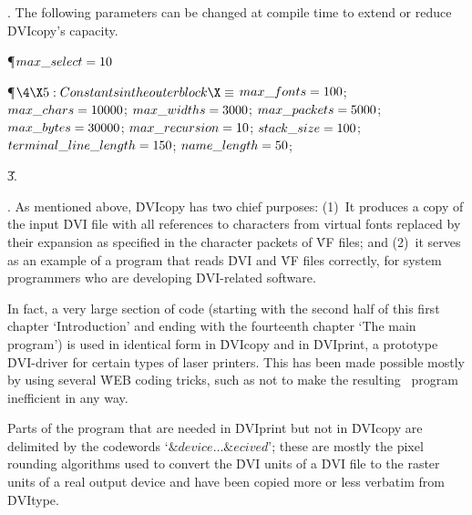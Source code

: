 . The following parameters can be changed at compile time to extend or
reduce \.{DVIcopy}'s capacity.

\Y\P\D {}$\\{max\_select}=10$\par
\Y\P$\4\X5:Constants in the outer block\X\S$\6
$\\{max\_fonts}=100$;\6
$\\{max\_chars}=10000$;\6
$\\{max\_widths}=3000$;\6
$\\{max\_packets}=5000$;\6
$\\{max\_bytes}=30000$;\6
$\\{max\_recursion}=10$;\6
$\\{stack\_size}=100$;\6
$\\{terminal\_line\_length}=150$;\6
$\\{name\_length}=50$;\par
\U3.\fi

. As mentioned above, \.{DVIcopy} has two chief purposes: (1)~It produces
a copy of the input \.{DVI} file with all references to characters from
virtual fonts replaced by their expansion as specified in the character
packets of \.{VF} files; and (2)~it serves as an example of a program
that reads \.{DVI} and \.{VF} files correctly, for system programmers
who are developing \.{DVI}-related software.

In fact, a very large section of code (starting with the second half of
this first chapter `Introduction' and ending with the fourteenth chapter
`The main program') is used in identical form in \.{DVIcopy} and in
\.{DVIprint}, a prototype \.{DVI}-driver for certain types of laser
printers. This has been made possible mostly by using several \.{WEB}
coding tricks, such as not to make the resulting \PASCAL\ program
inefficient in any way.

Parts of the program that are needed in \.{DVIprint} but not in
\.{DVIcopy} are delimited by the codewords `$ \&{device} \ldots  \&{ecived} $';
these are mostly the pixel rounding algorithms used to convert the
\.{DVI} units of a \.{DVI} file to the raster units of a real output
device and have been copied more or less verbatim from \.{DVItype}.

